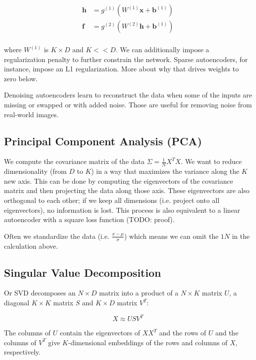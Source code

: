 \documentclass{article}
\newcommand{\vf}[1]{\mathbf{#1}}
\newcommand{\bx}{\vf{x}}
\begin{document}
\begin{align*}
    \vf{h} &= g^{(1)}(W^{(1)} \bx + \vf{b}^{(1)}) \\
    \vf{f} &= g^{(2)}(W^{(2)} \vf{h} + \vf{b}^{(1)}) \\
\end{align*}

where $W^{(1)}$ is $K \times D$ and $K << D$. We can additionally impose a regularization penalty to further constrain the network. Sparse autoencoders, for instance, impose an L1 regularization. More about why that drives weights to zero below.
\vskip 0.1in

Denoising autoencoders learn to reconstruct the data when some of the inputs are missing or swapped or with added noise. Those are useful for removing noise from real-world images. 

\subsection{Principal Component Analysis (PCA)}
We compute the covariance matrix of the data $\Sigma = \frac{1}{N} X^T X$. We want to reduce dimensionality (from $D$ to $K$) in a way that maximizes the variance along the $K$ new axis. This can be done by computing the eigenvectors of the covariance matrix and then projecting the data along those axis. These eigenvectors are also orthogonal to each other; if we keep all dimensions (i.e. project onto all eigenvectors), no information is lost. This process is also equivalent to a linear autoencoder with a square loss function (TODO: proof).
\vskip 0.1in

Often we standardize the data (i.e. $\frac{x - \mu}{\sigma}$) which means we can omit the ${1}{N}$ in the calculation above. 

\subsection{Singular Value Decomposition}
Or SVD decomposes an $N\times D$ matrix into a product of a $N\times K$ matrix $U$, a diagonal $K\times K$ matrix $S$ and $K\times D$ matrix $V^T$:

\begin{equation*}
    X \approx USV^T
\end{equation*}

The columns of $U$ contain the eigenvectors of $X X^T$ and the rows of $U$ and the columns of $V^T$ give $K$-dimensional embeddings of the rows and columns of $X$, respectively.
\end{document}
